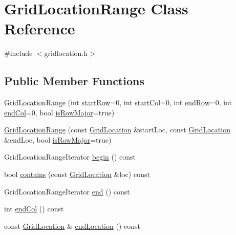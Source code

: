 \hypertarget{classGridLocationRange}{}\section{Grid\+Location\+Range Class Reference}
\label{classGridLocationRange}


{\ttfamily \#include $<$gridlocation.\+h$>$}

\subsection*{Public Member Functions}
\begin{DoxyCompactItemize}
\item 
\mbox{\hyperlink{classGridLocationRange_ad35db7c23ea349daa74db15cb49e35ab}{Grid\+Location\+Range}} (int \mbox{\hyperlink{classGridLocationRange_a83342cfc6cc0c1e7d335908d2bd9fb0b}{start\+Row}}=0, int \mbox{\hyperlink{classGridLocationRange_a64ef3d56a680766cc1921bc92b4d5e3e}{start\+Col}}=0, int \mbox{\hyperlink{classGridLocationRange_a4090535ae1ccb444498c816bad6c2c64}{end\+Row}}=0, int \mbox{\hyperlink{classGridLocationRange_ad8aed017dac65cea808dc3c668e39752}{end\+Col}}=0, bool \mbox{\hyperlink{classGridLocationRange_a78a78e39d2a36dd8eed1e83499d5a9d9}{is\+Row\+Major}}=true)
\item 
\mbox{\hyperlink{classGridLocationRange_ad6f1526ab7c2ba9728acc147e3371a38}{Grid\+Location\+Range}} (const \mbox{\hyperlink{structGridLocation}{Grid\+Location}} \&start\+Loc, const \mbox{\hyperlink{structGridLocation}{Grid\+Location}} \&end\+Loc, bool \mbox{\hyperlink{classGridLocationRange_a78a78e39d2a36dd8eed1e83499d5a9d9}{is\+Row\+Major}}=true)
\item 
Grid\+Location\+Range\+Iterator \mbox{\hyperlink{classGridLocationRange_abd833755fc74d34b27fcb7dafdf91ce2}{begin}} () const
\item 
bool \mbox{\hyperlink{classGridLocationRange_abda665ef6af1d9cc75c51829724d8bee}{contains}} (const \mbox{\hyperlink{structGridLocation}{Grid\+Location}} \&loc) const
\item 
Grid\+Location\+Range\+Iterator \mbox{\hyperlink{classGridLocationRange_abf85395b0f84fdb2ee2c8f35de44f4e0}{end}} () const
\item 
int \mbox{\hyperlink{classGridLocationRange_ad8aed017dac65cea808dc3c668e39752}{end\+Col}} () const
\item 
const \mbox{\hyperlink{structGridLocation}{Grid\+Location}} \& \mbox{\hyperlink{classGridLocationRange_a709b054ac01bb584ed7f5b0784932f8d}{end\+Location}} () const

\end{DoxyCompactItemize}
